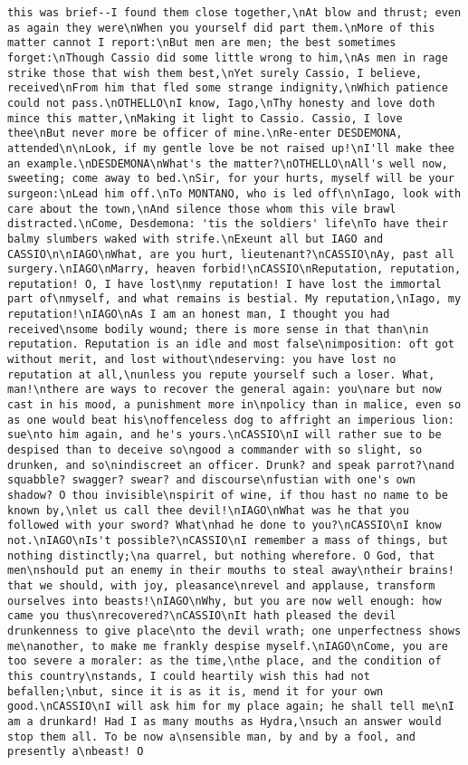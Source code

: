 \begin{verbatim}
this was brief--I found them close together,\nAt blow and thrust; even as again they were\nWhen you yourself did part them.\nMore of this matter cannot I report:\nBut men are men; the best sometimes forget:\nThough Cassio did some little wrong to him,\nAs men in rage strike those that wish them best,\nYet surely Cassio, I believe, received\nFrom him that fled some strange indignity,\nWhich patience could not pass.\nOTHELLO\nI know, Iago,\nThy honesty and love doth mince this matter,\nMaking it light to Cassio. Cassio, I love thee\nBut never more be officer of mine.\nRe-enter DESDEMONA, attended\n\nLook, if my gentle love be not raised up!\nI'll make thee an example.\nDESDEMONA\nWhat's the matter?\nOTHELLO\nAll's well now, sweeting; come away to bed.\nSir, for your hurts, myself will be your surgeon:\nLead him off.\nTo MONTANO, who is led off\n\nIago, look with care about the town,\nAnd silence those whom this vile brawl distracted.\nCome, Desdemona: 'tis the soldiers' life\nTo have their balmy slumbers waked with strife.\nExeunt all but IAGO and CASSIO\n\nIAGO\nWhat, are you hurt, lieutenant?\nCASSIO\nAy, past all surgery.\nIAGO\nMarry, heaven forbid!\nCASSIO\nReputation, reputation, reputation! O, I have lost\nmy reputation! I have lost the immortal part of\nmyself, and what remains is bestial. My reputation,\nIago, my reputation!\nIAGO\nAs I am an honest man, I thought you had received\nsome bodily wound; there is more sense in that than\nin reputation. Reputation is an idle and most false\nimposition: oft got without merit, and lost without\ndeserving: you have lost no reputation at all,\nunless you repute yourself such a loser. What, man!\nthere are ways to recover the general again: you\nare but now cast in his mood, a punishment more in\npolicy than in malice, even so as one would beat his\noffenceless dog to affright an imperious lion: sue\nto him again, and he's yours.\nCASSIO\nI will rather sue to be despised than to deceive so\ngood a commander with so slight, so drunken, and so\nindiscreet an officer. Drunk? and speak parrot?\nand squabble? swagger? swear? and discourse\nfustian with one's own shadow? O thou invisible\nspirit of wine, if thou hast no name to be known by,\nlet us call thee devil!\nIAGO\nWhat was he that you followed with your sword? What\nhad he done to you?\nCASSIO\nI know not.\nIAGO\nIs't possible?\nCASSIO\nI remember a mass of things, but nothing distinctly;\na quarrel, but nothing wherefore. O God, that men\nshould put an enemy in their mouths to steal away\ntheir brains! that we should, with joy, pleasance\nrevel and applause, transform ourselves into beasts!\nIAGO\nWhy, but you are now well enough: how came you thus\nrecovered?\nCASSIO\nIt hath pleased the devil drunkenness to give place\nto the devil wrath; one unperfectness shows me\nanother, to make me frankly despise myself.\nIAGO\nCome, you are too severe a moraler: as the time,\nthe place, and the condition of this country\nstands, I could heartily wish this had not befallen;\nbut, since it is as it is, mend it for your own good.\nCASSIO\nI will ask him for my place again; he shall tell me\nI am a drunkard! Had I as many mouths as Hydra,\nsuch an answer would stop them all. To be now a\nsensible man, by and by a fool, and presently a\nbeast! O 
\end{verbatim}
